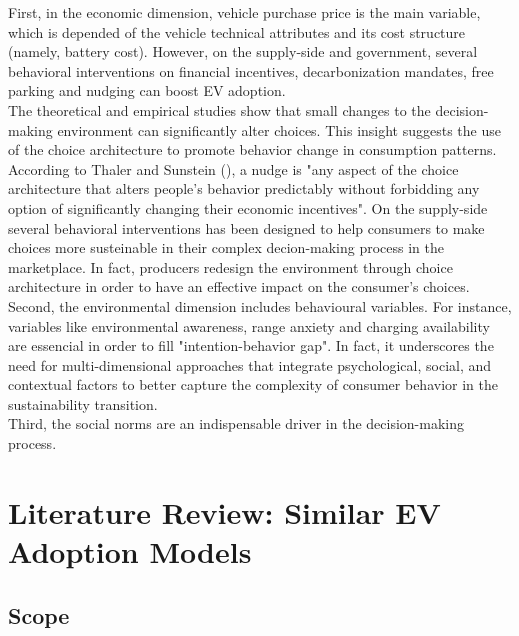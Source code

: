 \documentclass[11pt]{article} %
\begin{document}
First, in the economic dimension, vehicle purchase price is the main variable, which is depended
of the vehicle technical attributes and its cost structure (namely, battery cost). However, 
on the supply-side and government, several behavioral interventions on 
financial incentives,  decarbonization mandates, free parking and nudging
can boost EV adoption.\\

The theoretical and empirical studies show that small changes to the decision-making environment 
can significantly alter choices. This insight suggests the use of the choice architecture to promote 
behavior change in consumption patterns. 
According to Thaler and Sunstein (\cite{ThalerSunstein}), 
a nudge is "any aspect of the choice architecture that alters people's behavior predictably 
without forbidding any option of significantly changing their economic incentives".  
On the supply-side several behavioral interventions has been designed to help consumers 
to make choices more susteinable in their complex decion-making process in the marketplace. 
In fact, producers redesign the environment through choice architecture in order to have an effective
impact on the consumer's choices.\\



Second, the environmental dimension includes behavioural variables. For instance,
variables like environmental awareness, range anxiety and charging availability are 
essencial in order to fill "intention-behavior gap". In fact, it underscores the need for multi-dimensional 
approaches that integrate psychological, social, and contextual factors to better capture the 
complexity of consumer behavior in the sustainability transition.\\

Third, the social norms are an indispensable driver in the decision-making process.\\










\newpage

\section{Literature Review: Similar EV Adoption Models}

\subsection{Scope}
\end{document}
